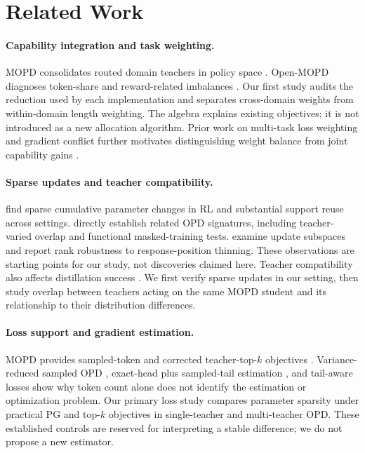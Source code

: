 \section{Related Work}

\paragraph{Capability integration and task weighting.}
MOPD consolidates routed domain teachers in policy space
\citep{ma2026mopdmultiteacheronpolicydistillation}.
Open-MOPD diagnoses token-share and reward-related imbalances
\citep{gao2026openmopddiagnosingfixingcapability}.
Our first study audits the reduction used by each implementation and
separates cross-domain weights from within-domain length weighting.
The algebra explains existing objectives; it is not introduced as a
new allocation algorithm. Prior work on multi-task loss weighting and
gradient conflict further motivates distinguishing weight balance from
joint capability gains \citep{chen2018gradnorm,yu2020gradientsurgerymultitasklearning}.

\paragraph{Sparse updates and teacher compatibility.}
\citet{mukherjee2025subnetworks} find sparse cumulative parameter changes
in RL and substantial support reuse across settings.
\citet{yu2026denseupdates} directly establish related OPD signatures,
including teacher-varied overlap and functional masked-training tests.
\citet{shen2026opdgeometry} examine update subspaces and report rank
robustness to response-position thinning. These observations are
starting points for our study, not discoveries claimed here.
Teacher compatibility also affects distillation success
\citep{li2026rethinkingopd,ma2026mopdmultiteacheronpolicydistillation}.
We first verify sparse updates in our setting, then study overlap
between teachers acting on the same MOPD student and its relationship
to their distribution differences.

\paragraph{Loss support and gradient estimation.}
MOPD provides sampled-token and corrected teacher-top-$k$ objectives
\citep{ma2026mopdmultiteacheronpolicydistillation}.
Variance-reduced sampled OPD \citep{oh2026vopd}, exact-head plus
sampled-tail estimation \citep{zhang2026emapg}, and tail-aware losses
\citep{huang2026tailaware} show why token count alone does not identify
the estimation or optimization problem. Our primary loss study compares parameter sparsity under practical PG
and top-$k$ objectives in single-teacher and multi-teacher OPD. These
established controls are reserved for interpreting a stable difference;
we do not propose a new estimator.
